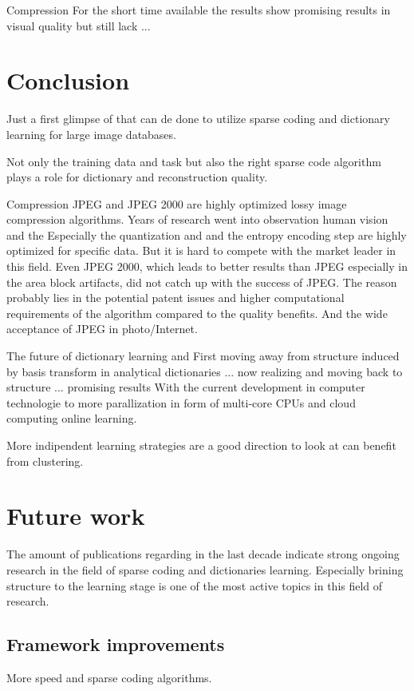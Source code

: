 Compression
For the short time available the results show promising results in visual
quality but still lack ...

\section{Conclusion}
Just a first glimpse of that can de done to utilize sparse coding and
dictionary learning for large image databases.

Not only the training data and task but also the right
sparse code algorithm plays a role for dictionary and reconstruction quality.

Compression 
JPEG and JPEG 2000 are highly optimized lossy image compression algorithms. 
Years of research went into observation human vision and the 
Especially the quantization and and the entropy encoding step are highly
optimized for specific data.
But it is hard to compete with the market leader in this field.  Even JPEG 2000,
which leads to better results than JPEG especially in the area block artifacts,
did not catch up with the success of JPEG. 
The reason probably lies in the potential patent issues and higher computational
requirements of the algorithm compared
to the quality benefits. And the wide acceptance of JPEG in photo/Internet.

The future of dictionary learning and 
First moving away from structure induced by basis transform in analytical
dictionaries ... now realizing and moving back to structure ... promising
results\cite{?,?,?}
With the current development in computer technologie to more
parallization in form of multi-core CPUs and cloud computing online learning. 

More indipendent learning strategies are a good direction to look at can
benefit from clustering. 


\section{Future work}
The amount of publications regarding in the last decade indicate strong ongoing
research in the field of sparse coding and dictionaries learning. Especially
brining structure to the learning stage is one of the most active topics in this
field of research. 

\subsection{Framework improvements}
More speed and sparse coding algorithms.

